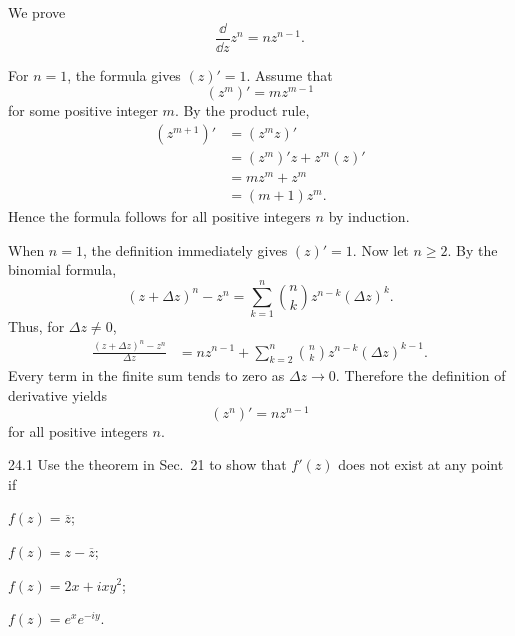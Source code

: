 \documentclass[11pt,oneside]{article}
\begin{document}
\begin{solution}
We prove
\[
    \frac{\dd}{\dd z}z^n=nz^{n-1}.
\]
\begin{exercisesubparts}
    \item For \(n=1\), the formula gives \((z)'=1\). Assume that
    \[
        (z^m)'=mz^{m-1}
    \]
    for some positive integer \(m\). By the product rule,
    \[
    \begin{aligned}
        (z^{m+1})'
        &=(z^m z)'\\
        &=(z^m)'z+z^m(z)'\\
        &=mz^m+z^m\\
        &=(m+1)z^m.
    \end{aligned}
    \]
    Hence the formula follows for all positive integers \(n\) by induction.

    \item When \(n=1\), the definition immediately gives \((z)'=1\). Now let \(n\ge2\). By the binomial formula,
    \[
        (z+\Delta z)^n-z^n
        =\sum_{k=1}^{n}\binom nk z^{n-k}(\Delta z)^k.
    \]
    Thus, for \(\Delta z\ne0\),
    \[
    \begin{aligned}
        \frac{(z+\Delta z)^n-z^n}{\Delta z}
        &=nz^{n-1}
          +\sum_{k=2}^{n}\binom nk z^{n-k}(\Delta z)^{k-1}.
    \end{aligned}
    \]
    Every term in the finite sum tends to zero as \(\Delta z\to0\). Therefore the definition of derivative yields
    \[
        \boxed{(z^n)'=nz^{n-1}}
    \]
    for all positive integers \(n\).
\end{exercisesubparts}
\end{solution}

\begin{exercise}{24.1}
Use the theorem in Sec.~21 to show that \(f'(z)\) does not exist at any point if
\begin{exercisesubparts}
    \item \(f(z)=\overline z\);
    \item \(f(z)=z-\overline z\);
    \item \(f(z)=2x+ixy^2\);
    \item \(f(z)=e^x e^{-iy}\).
\end{exercisesubparts}
\end{exercise}
\end{document}
